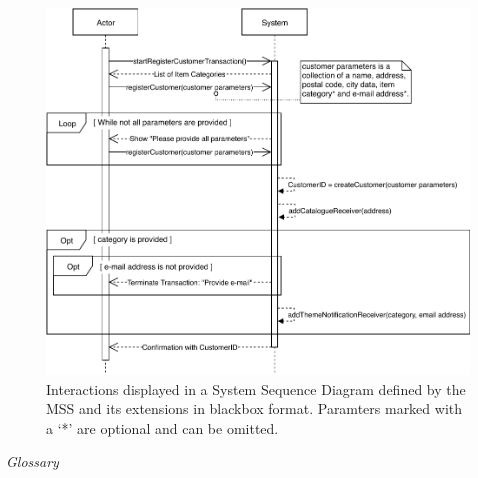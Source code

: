 \begin{figure}[H]
	\centering
	\includegraphics[scale=1]{uml/SD-bb-regcust.pdf}
	\caption*{Interactions displayed in a System Sequence Diagram defined by the MSS and its extensions in blackbox format. Paramters marked with a `*' are optional and can be omitted.}
\end{figure}
\newpage
\textsl{Glossary}
